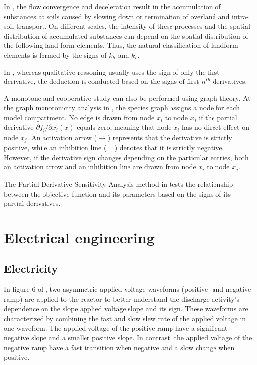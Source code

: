 \documentclass[11pt]{book}
\begin{document}
In \cite{florinsky2000relationships}, the flow convergence and deceleration
result in the accumulation of substances at soils caused by slowing
down or termination of overland and intra-soil transport. On different
scales, the intensity of these processes and the spatial distribution
of accumulated substances can depend on the spatial distribution of
the following land-form elements. Thus, the natural classification
of landform elements is formed by the signs of $k_{h}$ and $k_{v}$.

In \cite{tiwari2002series}, whereas qualitative reasoning usually
uses the sign of only the first derivative, the deduction is conducted
based on the signs of first $n^{th}$ derivatives.

A monotone and cooperative study can also be performed using graph
theory. At the graph monotonicity analysis in \cite{de2013computation},
the species graph assigns a node for each model compartment. No edge
is drawn from node $x_{i}$ to node $x_{j}$ if the partial derivative
$\partial f_{j}/\partial x_{i}(x)$ equals zero, meaning that node
$x_{i}$ has no direct effect on node $x_{j}$. An activation arrow
($\longrightarrow$) represents that the derivative is strictly positive,
while an inhibition line ($\dashv$) denotes that it is strictly negative.
However, if the derivative sign changes depending on the particular
entries, both an activation arrow and an inhibition line are drawn
from node $x_{i}$ to node $x_{j}$.

The Partial Derivative Sensitivity Analysis method in \cite{pasandideh2020modeling}
tests the relationship between the objective function and its parameters
based on the signs of its partial derivatives.


\section{Electrical engineering}


\subsection{Electricity}

In figure 6 of \cite{abdelaziz2015influence}, two asymmetric applied-voltage
waveforms (positive- and negative- ramp) are applied to the reactor
to better understand the discharge activity's dependence on the slope
applied voltage slope and its sign. These waveforms are characterized
by combining the fast and slow slew rate of the applied voltage in
one waveform. The applied voltage of the positive ramp have a significant
negative slope and a smaller positive slope. In contrast, the applied
voltage of the negative ramp have a fast transition when negative
and a slow change when positive.
\end{document}
